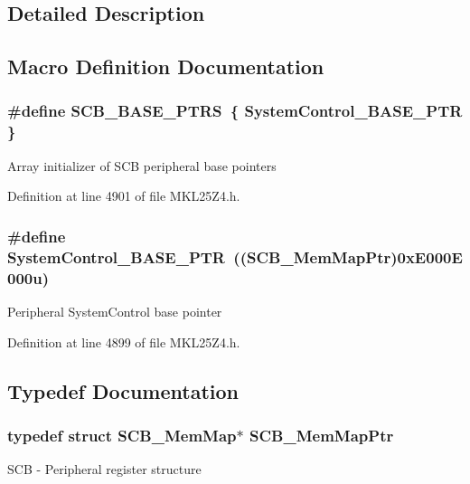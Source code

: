 \subsection{Detailed Description}


\subsection{Macro Definition Documentation}
\subsubsection[{\texorpdfstring{S\+C\+B\+\_\+\+B\+A\+S\+E\+\_\+\+P\+T\+RS}{SCB_BASE_PTRS}}]{\setlength{\rightskip}{0pt plus 5cm}\#define S\+C\+B\+\_\+\+B\+A\+S\+E\+\_\+\+P\+T\+RS~\{ {\bf System\+Control\+\_\+\+B\+A\+S\+E\+\_\+\+P\+TR} \}}\hypertarget{group___s_c_b___peripheral_gaf74b4dbfa6fd0a5607314e170a0c1d48}{}\label{group___s_c_b___peripheral_gaf74b4dbfa6fd0a5607314e170a0c1d48}
Array initializer of S\+CB peripheral base pointers 

Definition at line 4901 of file M\+K\+L25\+Z4.\+h.

\subsubsection[{\texorpdfstring{System\+Control\+\_\+\+B\+A\+S\+E\+\_\+\+P\+TR}{SystemControl_BASE_PTR}}]{\setlength{\rightskip}{0pt plus 5cm}\#define System\+Control\+\_\+\+B\+A\+S\+E\+\_\+\+P\+TR~(({\bf S\+C\+B\+\_\+\+Mem\+Map\+Ptr})0x\+E000\+E000u)}\hypertarget{group___s_c_b___peripheral_gaf22864785770f832103e904244e078cb}{}\label{group___s_c_b___peripheral_gaf22864785770f832103e904244e078cb}
Peripheral System\+Control base pointer 

Definition at line 4899 of file M\+K\+L25\+Z4.\+h.



\subsection{Typedef Documentation}
\subsubsection[{\texorpdfstring{S\+C\+B\+\_\+\+Mem\+Map\+Ptr}{SCB_MemMapPtr}}]{\setlength{\rightskip}{0pt plus 5cm}typedef struct {\bf S\+C\+B\+\_\+\+Mem\+Map}$\ast$ {\bf S\+C\+B\+\_\+\+Mem\+Map\+Ptr}}\hypertarget{group___s_c_b___peripheral_ga08aca299c99cac47121d9e64e7b8e1cf}{}\label{group___s_c_b___peripheral_ga08aca299c99cac47121d9e64e7b8e1cf}
S\+CB -\/ Peripheral register structure 